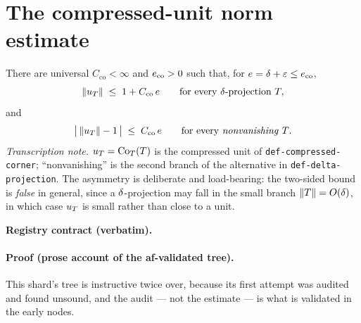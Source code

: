 \section{The compressed-unit norm estimate}\label{sec:compcb-compressed-unit-norm}

\begin{lemma}\label{lem:compcb-compressed-unit-norm}
There are universal $C_{\mathrm{co}}<\infty$ and $e_{\mathrm{co}}>0$ such that, for
$e=\delta+\varepsilon\le e_{\mathrm{co}}$,
\begin{equation}\label{eq:cun-upper}
  \lVert u_{T}\rVert\;\le\;1+C_{\mathrm{co}}\,e
  \qquad\text{for every $\delta$-projection }T,
\end{equation}
and
\begin{equation}\label{eq:cun-two-sided}
  \bigl\lvert\,\lVert u_{T}\rVert-1\,\bigr\rvert\;\le\;C_{\mathrm{co}}\,e
  \qquad\text{for every \emph{nonvanishing} $T$.}
\end{equation}
\emph{Transcription note.} $u_{T}=\mathrm{Co}_{T}(T)$ is the compressed unit of
\texttt{def-compressed-corner}; ``nonvanishing'' is the second branch of the alternative
in \texttt{def-delta-projection}. The asymmetry is deliberate and load-bearing: the
two-sided bound is \emph{false} in general, since a $\delta$-projection may fall in the
small branch $\lVert T\rVert=O(\delta)$, in which case $u_{T}$ is small rather than close to
a unit.
\end{lemma}

\noindent\textbf{Registry contract (verbatim).}

\paragraph{Proof (prose account of the af-validated tree).}
This shard's tree is instructive twice over, because its first attempt was audited and
found unsound, and the audit --- not the estimate --- is what is validated in the early
nodes.

